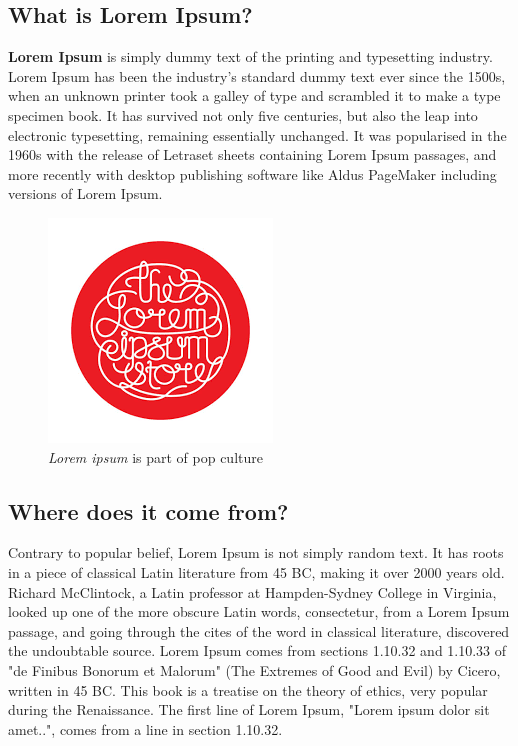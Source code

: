 \documentclass[12pt]{article}
\begin{document}
\begin{multicols}{2}
\subsection*{What is Lorem Ipsum?}
\textbf{Lorem Ipsum} is simply dummy text of the printing and typesetting industry. Lorem Ipsum has been the industry's standard dummy text ever since the 1500s, when an unknown printer took a galley of type and scrambled it to make a type specimen book. It has survived not only five centuries, but also the leap into electronic typesetting, remaining essentially unchanged. It was popularised in the 1960s with the release of Letraset sheets containing Lorem Ipsum passages, and more recently with desktop publishing software like Aldus PageMaker including versions of Lorem Ipsum.

\begin{figure}[H] %
\centering
\includegraphics[width=0.5\linewidth]{ipsum_logo}
\caption{\textit{Lorem ipsum} is part of pop culture\centering}
\end{figure}



\subsection*{Where does it come from?}
Contrary to popular belief, Lorem Ipsum is not simply random text. It has roots in a piece of classical Latin literature from 45 BC, making it over 2000 years old. Richard McClintock, a Latin professor at Hampden-Sydney College in Virginia, looked up one of the more obscure Latin words, consectetur, from a Lorem Ipsum passage, and going through the cites of the word in classical literature, discovered the undoubtable source. Lorem Ipsum comes from sections 1.10.32 and 1.10.33 of "de Finibus Bonorum et Malorum" (The Extremes of Good and Evil) by Cicero, written in 45 BC. This book is a treatise on the theory of ethics, very popular during the Renaissance. The first line of Lorem Ipsum, "Lorem ipsum dolor sit amet..", comes from a line in section 1.10.32.


\end{multicols}
\end{document}
